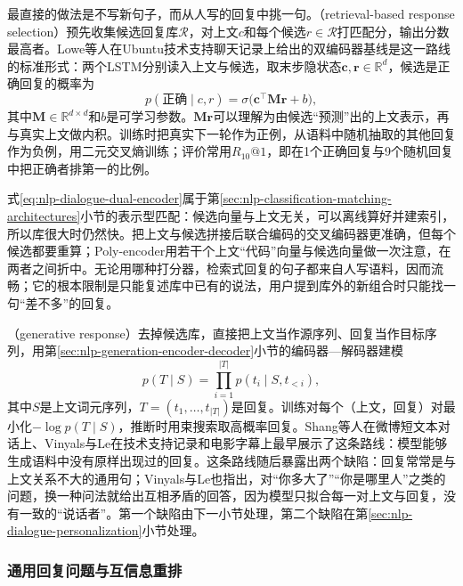 最直接的做法是不写新句子，而从人写的回复中挑一句。（retrieval-based response selection）预先收集候选回复库$\mathcal{R}$，对上文$c$和每个候选$r\in\mathcal{R}$打匹配分，输出分数最高者。Lowe等人在Ubuntu技术支持聊天记录上给出的双编码器基线是这一路线的标准形式：两个LSTM分别读入上文与候选，取末步隐状态$\bm{c},\bm{r}\in\mathbb{R}^{d}$，候选是正确回复的概率为
\begin{equation}
 p(\text{正确}\mid c,r)=\sigma\bigl(\bm{c}^{\top}\bm{M}\bm{r}+b\bigr),
 \label{eq:nlp-dialogue-dual-encoder}
\end{equation}
其中$\bm{M}\in\mathbb{R}^{d\times d}$和$b$是可学习参数。$\bm{M}\bm{r}$可以理解为由候选“预测”出的上文表示，再与真实上文做内积。训练时把真实下一轮作为正例，从语料中随机抽取的其他回复作为负例，用二元交叉熵训练；评价常用$R_{10}@1$，即在1个正确回复与9个随机回复中把正确者排第一的比例。

式\eqref{eq:nlp-dialogue-dual-encoder}属于第\ref{sec:nlp-classification-matching-architectures}小节的表示型匹配：候选向量与上文无关，可以离线算好并建索引，所以库很大时仍然快。把上文与候选拼接后联合编码的交叉编码器更准确，但每个候选都要重算；Poly-encoder用若干个上文“代码”向量与候选向量做一次注意，在两者之间折中。无论用哪种打分器，检索式回复的句子都来自人写语料，因而流畅；它的根本限制是只能复述库中已有的说法，用户提到库外的新组合时只能找一句“差不多”的回复。

（generative response）去掉候选库，直接把上文当作源序列、回复当作目标序列，用第\ref{sec:nlp-generation-encoder-decoder}小节的编码器—解码器建模
\begin{equation}
 p(T\mid S)=\prod_{i=1}^{|T|}p(t_i\mid S,t_{<i}),
 \label{eq:nlp-dialogue-seq2seq}
\end{equation}
其中$S$是上文词元序列，$T=(t_1,\ldots,t_{|T|})$是回复。训练对每个（上文，回复）对最小化$-\log p(T\mid S)$，推断时用束搜索取高概率回复。Shang等人在微博短文本对话上、Vinyals与Le在技术支持记录和电影字幕上最早展示了这条路线：模型能够生成语料中没有原样出现过的回复\cite{nlp-dialogue-shang2015,nlp-dialogue-vinyals2015}。这条路线随后暴露出两个缺陷：回复常常是与上文关系不大的通用句；Vinyals与Le也指出，对“你多大了”“你是哪里人”之类的问题，换一种问法就给出互相矛盾的回答，因为模型只拟合每一对上文与回复，没有一致的“说话者”。第一个缺陷由下一小节处理，第二个缺陷在第\ref{sec:nlp-dialogue-personalization}小节处理。

\subsubsection{通用回复问题与互信息重排}
\label{sec:nlp-dialogue-mmi}


